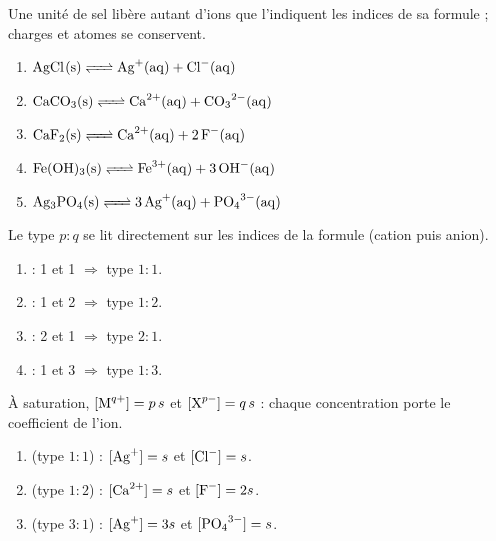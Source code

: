\documentclass[11pt,a4paper]{article}
\begin{document}
\begin{corrige}
Une unité de sel libère autant d'ions que l'indiquent les indices de sa formule ; charges et atomes se
conservent.
\begin{enumerate}[label=\alph*)]
  \item $\ce{AgCl(s) <=> Ag^{+}(aq) + Cl^{-}(aq)}$
  \item $\ce{CaCO3(s) <=> Ca^{2+}(aq) + CO3^{2-}(aq)}$
  \item $\ce{CaF2(s) <=> Ca^{2+}(aq) + 2 F^{-}(aq)}$
  \item $\ce{Fe(OH)3(s) <=> Fe^{3+}(aq) + 3 OH^{-}(aq)}$
  \item $\ce{Ag3PO4(s) <=> 3 Ag^{+}(aq) + PO4^{3-}(aq)}$
\end{enumerate}
\end{corrige}

\begin{corrige}
Le type $p{:}q$ se lit directement sur les indices de la formule (cation puis anion).
\begin{enumerate}[label=\alph*)]
  \item {} : 1  et 1  $\Rightarrow$ type $1{:}1$.
  \item {} : 1  et 2  $\Rightarrow$ type $1{:}2$.
  \item {} : 2  et 1  $\Rightarrow$ type $2{:}1$.
  \item {} : 1  et 3  $\Rightarrow$ type $1{:}3$.
\end{enumerate}
\end{corrige}

\begin{corrige}
À saturation, $[\ce{M^{q+}}]=p\,s$ et $[\ce{X^{p-}}]=q\,s$ : chaque concentration porte le coefficient
de l'ion.
\begin{enumerate}[label=\alph*)]
  \item {} (type $1{:}1$) : $[\ce{Ag+}]=s$ et $[\ce{Cl-}]=s$.
  \item {} (type $1{:}2$) : $[\ce{Ca^{2+}}]=s$ et $[\ce{F-}]=2s$.
  \item {} (type $3{:}1$) : $[\ce{Ag+}]=3s$ et $[\ce{PO4^{3-}}]=s$.
\end{enumerate}
\end{corrige}
\end{document}
